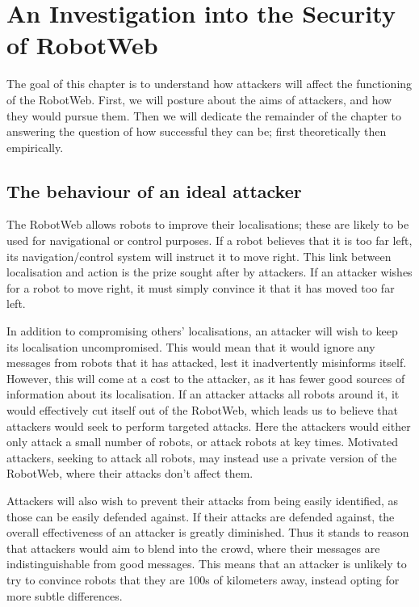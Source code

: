 \chapter{An Investigation into the Security of RobotWeb}
The goal of this chapter is to understand how attackers will affect the functioning of the RobotWeb. First, we will posture about the aims of attackers, and how they would pursue them. Then we will dedicate the remainder of the chapter to answering the question of how successful they can be; first theoretically then empirically.

\section{The behaviour of an ideal attacker}
The RobotWeb allows robots to improve their localisations; these are likely to be used for navigational or control purposes. If a robot believes that it is too far left, its navigation/control system will instruct it to move right. This link between localisation and action is the prize sought after by attackers. If an attacker wishes for a robot to move right, it must simply convince it that it has moved too far left.

In addition to compromising others' localisations, an attacker will wish to keep its localisation uncompromised. This would mean that it would ignore any messages from robots that it has attacked, lest it inadvertently misinforms itself. However, this will come at a cost to the attacker, as it has fewer good sources of information about its localisation. If an attacker attacks all robots around it, it would effectively cut itself out of the RobotWeb, which leads us to believe that attackers would seek to perform targeted attacks. Here the attackers would either only attack a small number of robots, or attack robots at key times. Motivated attackers, seeking to attack all robots, may instead use a private version of the RobotWeb, where their attacks don't affect them.

Attackers will also wish to prevent their attacks from being easily identified, as those can be easily defended against. If their attacks are defended against, the overall effectiveness of an attacker is greatly diminished. Thus it stands to reason that attackers would aim to blend into the crowd, where their messages are indistinguishable from good messages. This means that an attacker is unlikely to try to convince robots that they are 100s of kilometers away, instead opting for more subtle differences.

